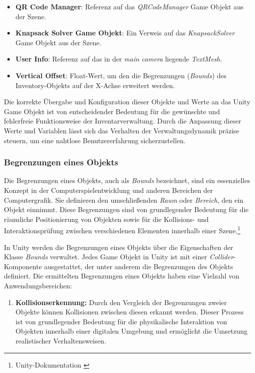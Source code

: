 \begin{itemize}
\begin{itemize}
    \item \textbf{QR Code Manager}: Referenz auf das \textit{QRCodeManager} Game Objekt aus der Szene.

    \item \textbf{Knapsack Solver Game Objekt}: Ein Verweis auf das \textit{KnapsackSolver} Game Objekt aus der Szene.

    \item \textbf{User Info}: Referenz auf das in der \textit{main camera} liegende \textit{TextMesh}.

    \item \textbf{Vertical Offset}: Float-Wert, um den die Begrenzungen (\textit{Bounds}) des Inventory-Objekts auf
    der X-Achse erweitert werden.
\end{itemize}

Die korrekte Übergabe und Konfiguration dieser Objekte und Werte an das Unity Game Objekt ist von entscheidender Bedeutung
für die gewünschte und fehlerfreie Funktionsweise der Inventarverwaltung. Durch die Anpassung dieser Werte und Variablen
lässt sich das Verhalten der Verwaltungsdynamik präzise steuern, um eine nahtlose Benutzererfahrung sicherzustellen.

\subsubsection{Begrenzungen eines Objekts}
Die Begrenzungen eines Objekts, auch als \textit{Bounds} bezeichnet, sind ein essenzielles Konzept in der Computerspielentwicklung
und anderen Bereichen der Computergrafik. Sie definieren den umschließenden \textit{Raum} oder \textit{Bereich}, den ein
Objekt einnimmt. Diese Begrenzungen sind von grundlegender Bedeutung für die räumliche Positionierung von Objekten sowie
für die Kollisions- und Interaktionsprüfung zwischen verschiedenen Elementen innerhalb einer Szene.\footnote{Unity-Dokumentation \cite{Bounds}}

In Unity werden die Begrenzungen eines Objekts über die Eigenschaften der Klasse \textit{Bounds} verwaltet. Jedes Game
Objekt in Unity ist mit einer \textit{Collider}-Komponente ausgestattet, der unter anderem die Begrenzungen des Objekts
definiert. Die ermittelten Begrenzungen eines Objekts haben eine Vielzahl von Anwendungsbereichen:

\begin{enumerate}
    \item \textbf{Kollisionserkennung:} Durch den Vergleich der Begrenzungen zweier Objekte können Kollisionen zwischen
    diesen erkannt werden. Dieser Prozess ist von grundlegender Bedeutung für die physikalische Interaktion von Objekten
    innerhalb einer digitalen Umgebung und ermöglicht die Umsetzung realistischer Verhaltensweisen.


\end{enumerate}
\end{itemize}
